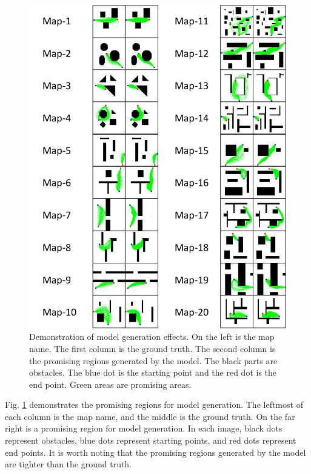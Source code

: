 \documentclass[smallcondensed]{svjour3}     %
\begin{document}
\begin{figure}
	\centering
	\includegraphics[width=1\linewidth]{generate-data-comparsion.pdf}
	\caption{Demonstration of model generation effects.
	On the left is the map name.
	The first column is the ground truth.
	The second column is the promising regions generated by the model.
	The black parts are obstacles.
	The blue dot is the starting point and the red dot is the end point.
	Green areas are promising areas.
	}     
	\label{fig: generate-data-comparsion}
\end{figure}

Fig. \ref{fig: generate-data-comparsion} demonstrates the promising regions for model generation.
The leftmost of each column is the map name, and the middle is the ground truth.
On the far right is a promising region for model generation.
In each image, black dots represent obstacles, blue dots represent starting points, and red dots represent end points.
It is worth noting that the promising regions generated by the model are tighter than the ground truth.
\end{document}
